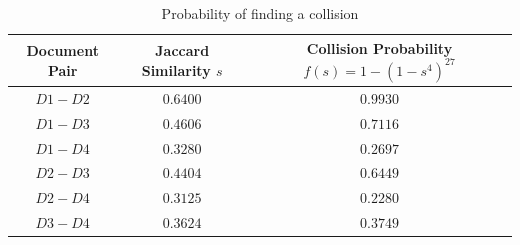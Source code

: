 \documentclass[11pt]{article}
\begin{document}
    \begin{table}[!h] 
    \centering
    \caption{Probability of finding a collision}
    \label{collprob}
    \begin{tabular}{|c|c|c|}
      \hline
   Document Pair & Jaccard Similarity $s$ & Collision Probability $f(s) = 1 - \left ( 1 - s^4 \right ) ^ {27}$   \\
      \hline      
      $D1-D2$ &   $0.6400$              &  $0.9930$   \\
      \hline      
      $D1-D3$ &    $0.4606$             & $0.7116$   \\
      \hline      
      $D1-D4$ &    $0.3280$           &  $0.2697$   \\
      \hline      
      $D2-D3$ &      $0.4404$          &  $0.6449$   \\
      \hline
      $D2-D4$ &      $0.3125$          &  $0.2280$   \\
      \hline
      $D3-D4$ &      $0.3624$          &  $0.3749$   \\
      \hline
    \end{tabular}
    \end{table}
\end{document}

